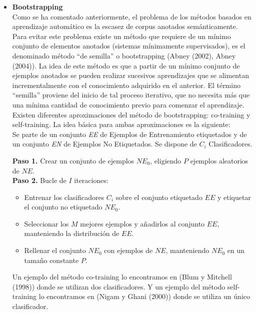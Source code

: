 \begin{itemize}
  \item \textbf{Bootstrapping} \\
  Como se ha comentado anteriormente, el problema de los métodos basados en aprendizaje automático es la escasez de corpus anotados semánticamente. Para evitar este problema existe un método que requiere de un mínimo conjunto de elementos anotados (sistemas mínimamente supervisados), es el denominado método “de semilla” o bootstrapping (Abney (2002), Abney (2004)). La idea de este método es que a partir de un mínimo conjunto de ejemplos anotados se pueden realizar sucesivos aprendizajes que se alimentan incrementalmente con el conocimiento adquirido en el anterior. El término “semilla” proviene del inicio de tal proceso iterativo, que no necesita más que una mínima cantidad de conocimiento previo para comenzar el aprendizaje. Existen diferentes aproximaciones del método de bootstrapping: co-training y self-training. La idea básica para ambas aproximaciones es la siguiente:\\
  Se parte de un conjunto \textit{EE} de Ejemplos de Entrenamiento etiquetados y de un conjunto \textit{EN} de Ejemplos No Etiquetados. Se dispone de $C_i$ Clasificadores.
  
  \textbf{Paso 1.} Crear un conjunto de ejemplos $NE_0$, eligiendo $P$ ejemplos aleatorios de $NE$.\\
  \textbf{Paso 2.} Bucle de $I$ iteraciones:
  \begin{itemize}
    \item Entrenar los clasificadores $C_i$ sobre el conjunto etiquetado $EE$ y etiquetar el conjunto no etiquetado $NE_0$.
    \item Seleccionar los $M$ mejores ejemplos y añadirlos al conjunto $EE$, manteniendo la distribución de $EE$.
    \item Rellenar el conjunto $NE_0$ con ejemplos de $NE$, manteniendo $NE_0$ en un tamaño constante $P$.
  \end{itemize}

  Un ejemplo del método co-training lo encontramos en (Blum y Mitchell (1998)) donde se utilizan dos clasificadores. Y un ejemplo del método self-training lo encontramos en (Nigam y Ghani (2000)) donde se utiliza un único clasificador.
  

\end{itemize}
